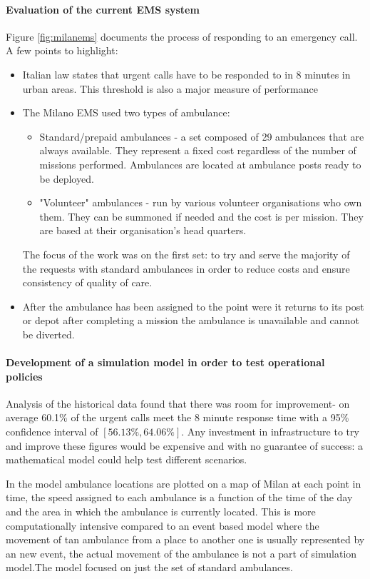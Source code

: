 \documentclass[11pt]{article} %
\begin{document}
\paragraph{Evaluation of the current EMS system }
	Figure \ref{fig:milanems} documents  the process of responding to an emergency call. A few points to highlight: 
	\begin{itemize}
		\item Italian law states that urgent calls have to be responded to in 8 minutes in urban areas. This threshold is also a major measure of performance 
		\item The Milano EMS used two types of ambulance: 
		\begin{itemize}
			\item Standard/prepaid ambulances - a set composed of 29 ambulances that are always available. They represent a fixed cost regardless of the number of missions performed. Ambulances are located at ambulance posts ready to be deployed.
			\item "Volunteer" ambulances - run by various volunteer organisations who own them. They can be summoned if needed and the cost is per mission. They are based at their organisation's head quarters.
		\end{itemize}
		The focus of the work was on the first set: to try and serve the majority of the requests with standard ambulances in order to reduce costs and ensure consistency of quality of care. 
		\item After the ambulance has been assigned to the point were it returns to its post or depot after completing a mission the ambulance is unavailable and cannot be diverted. 
	\end{itemize}
\paragraph{Development of a simulation model in order to test operational policies }
Analysis of the historical data found that there was room for improvement- on average 60.1\% of the urgent calls meet the 8 minute response time with a 95\% confidence interval of $ [56.13\%, 64.06\%] $. Any investment in infrastructure to try and improve these figures would be expensive and with no guarantee of success: a mathematical model could help test different scenarios. 

In the model ambulance locations are plotted on a map of Milan at each point in time, the speed assigned to each ambulance is a function of the time of the day and the area in which the ambulance is currently located. This is more  computationally intensive compared to an event based model where the movement of tan ambulance from a place to another one is usually represented by an new event, the actual movement of the ambulance is not a part of simulation model.The model focused on just the set of standard ambulances.
\end{document}
